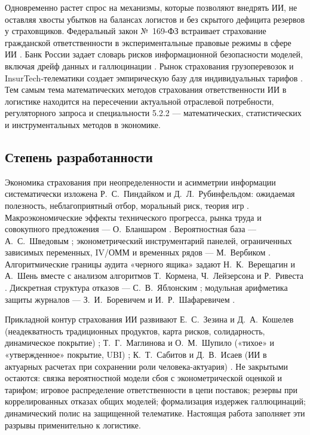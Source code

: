 \documentclass[a4paper,14pt]{extarticle}
\begin{document}
Одновременно растет спрос на механизмы, которые позволяют внедрять ИИ, не оставляя хвосты убытков на балансах логистов и без скрытого дефицита резервов у страховщиков. Федеральный закон №~169-ФЗ встраивает страхование гражданской ответственности в экспериментальные правовые режимы в сфере ИИ \cite{fz169}. Банк России задает словарь рисков информационной безопасности моделей, включая дрейф данных и галлюцинации \cite{cbr}. Рынок страхования грузоперевозок и InsurTech-телематики создает эмпирическую базу для индивидуальных тарифов \cite{insurtech, maglinova}. Тем самым тема математических методов страхования ответственности ИИ в логистике находится на пересечении актуальной отраслевой потребности, регуляторного запроса и специальности 5.2.2 --- математических, статистических и инструментальных методов в экономике.

\subsection*{Степень разработанности}

Экономика страхования при неопределенности и асимметрии информации систематически изложена Р.~С.~Пиндайком и Д.~Л.~Рубинфельдом: ожидаемая полезность, неблагоприятный отбор, моральный риск, теория игр \cite{pindyck}. Макроэкономические эффекты технического прогресса, рынка труда и совокупного предложения --- О.~Бланшаром \cite{blanchard}. Вероятностная база --- А.~С.~Шведовым \cite{shvedov}; эконометрический инструментарий панелей, ограниченных зависимых переменных, IV/ОММ и временных рядов --- М.~Вербиком \cite{verbeek}. Алгоритмические границы аудита «черного ящика» задают Н.~К.~Верещагин и А.~Шень \cite{vereshchagin} вместе с анализом алгоритмов Т.~Кормена, Ч.~Лейзерсона и Р.~Ривеста \cite{cormen}. Дискретная структура отказов --- С.~В.~Яблонским \cite{yablonsky}; модульная арифметика защиты журналов --- З.~И.~Боревичем и И.~Р.~Шафаревичем \cite{borevich}.

Прикладной контур страхования ИИ развивают Е.~С.~Зезина и Д.~А.~Кошелев (неадекватность традиционных продуктов, карта рисков, солидарность, динамическое покрытие) \cite{zezina}; Т.~Г.~Маглинова и О.~М.~Шупило («тихое» и «утвержденное» покрытие, UBI) \cite{maglinova}; К.~Т.~Сабитов и Д.~В.~Исаев (ИИ в актуарных расчетах при сохранении роли человека-актуария) \cite{sabitov}. Не закрытыми остаются: связка вероятностной модели сбоя с эконометрической оценкой и тарифом; игровое распределение ответственности в цепи поставок; резервы при коррелированных отказах общих моделей; формализация издержек галлюцинаций; динамический полис на защищенной телематике. Настоящая работа заполняет эти разрывы применительно к логистике.
\end{document}
